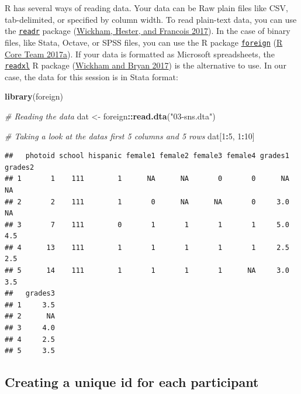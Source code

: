 \documentclass[
]{book}
\newenvironment{Shaded}{\begin{snugshade}}{\end{snugshade}}
\newcommand{\CommentTok}[1]{\textcolor[rgb]{0.56,0.35,0.01}{\textit{#1}}}
\newcommand{\DecValTok}[1]{\textcolor[rgb]{0.00,0.00,0.81}{#1}}
\newcommand{\FunctionTok}[1]{\textcolor[rgb]{0.13,0.29,0.53}{\textbf{#1}}}
\newcommand{\NormalTok}[1]{#1}
\newcommand{\OtherTok}[1]{\textcolor[rgb]{0.56,0.35,0.01}{#1}}
\newcommand{\SpecialCharTok}[1]{\textcolor[rgb]{0.81,0.36,0.00}{\textbf{#1}}}
\newcommand{\StringTok}[1]{\textcolor[rgb]{0.31,0.60,0.02}{#1}}
\begin{document}
R has several ways of reading data. Your data can be Raw plain files like CSV, tab-delimited, or specified by column width. To read plain-text data, you can use the \href{https://cran.r-project.org/package=readr}{\texttt{readr}} package (\protect\hyperlink{ref-R-readr}{Wickham, Hester, and Francois 2017}). In the case of binary files, like Stata, Octave, or SPSS files, you can use the R package \href{https://cran.r-project.org/package=readr}{\texttt{foreign}} (\protect\hyperlink{ref-R-foreign}{R Core Team 2017a}). If your data is formatted as Microsoft spreadsheets, the \href{https://cran.r-project.org/package=readxl}{\texttt{readxl}} R package (\protect\hyperlink{ref-R-readxl}{Wickham and Bryan 2017}) is the alternative to use. In our case, the data for this session is in Stata format:

\begin{Shaded}
\begin{Highlighting}[]
\FunctionTok{library}\NormalTok{(foreign)}

\CommentTok{\# Reading the data}
\NormalTok{dat }\OtherTok{\textless{}{-}}\NormalTok{ foreign}\SpecialCharTok{::}\FunctionTok{read.dta}\NormalTok{(}\StringTok{"03{-}sns.dta"}\NormalTok{)}

\CommentTok{\# Taking a look at the data\textquotesingle{}s first 5 columns and 5 rows}
\NormalTok{dat[}\DecValTok{1}\SpecialCharTok{:}\DecValTok{5}\NormalTok{, }\DecValTok{1}\SpecialCharTok{:}\DecValTok{10}\NormalTok{]}
\end{Highlighting}
\end{Shaded}

\begin{verbatim}
##   photoid school hispanic female1 female2 female3 female4 grades1 grades2
## 1       1    111        1      NA      NA       0       0      NA      NA
## 2       2    111        1       0      NA      NA       0     3.0      NA
## 3       7    111        0       1       1       1       1     5.0     4.5
## 4      13    111        1       1       1       1       1     2.5     2.5
## 5      14    111        1       1       1       1      NA     3.0     3.5
##   grades3
## 1     3.5
## 2      NA
## 3     4.0
## 4     2.5
## 5     3.5
\end{verbatim}

\hypertarget{creating-a-unique-id-for-each-participant}{%
\subsection{Creating a unique id for each participant}\label{creating-a-unique-id-for-each-participant}}
\end{document}
